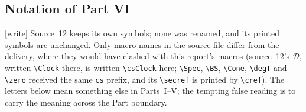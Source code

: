 \documentclass[11pt,letterpaper]{article}
\theoremstyle{definition}
\theoremstyle{remark}
\newcommand{\1}{\mathbf 1}
\newcommand{\csClock}{\mathcal D}
\newcommand{\wtag}{\textup{[write]}}%
\begin{document}
\subsection{Notation of Part VI}\label{lbh:cs:sec:notation}
\wtag{} Source~12 keeps its own symbols; none was renamed, and its printed symbols are unchanged.
Only macro names in the source file differ from the delivery, where they would have clashed with
this report's macros (source~12's $\csClock$, written \texttt{\textbackslash Clock} there, is
written \texttt{\textbackslash csClock} here; \texttt{\textbackslash Spec}, \texttt{\textbackslash BS},
\texttt{\textbackslash Cone}, \texttt{\textbackslash degT} and \texttt{\textbackslash zero} received
the same \texttt{cs} prefix, and its \texttt{\textbackslash secref} is printed by
\texttt{\textbackslash cref}). The letters below mean something else in Parts~I--V; the tempting
false reading is to carry the meaning across the Part boundary.
\end{document}
